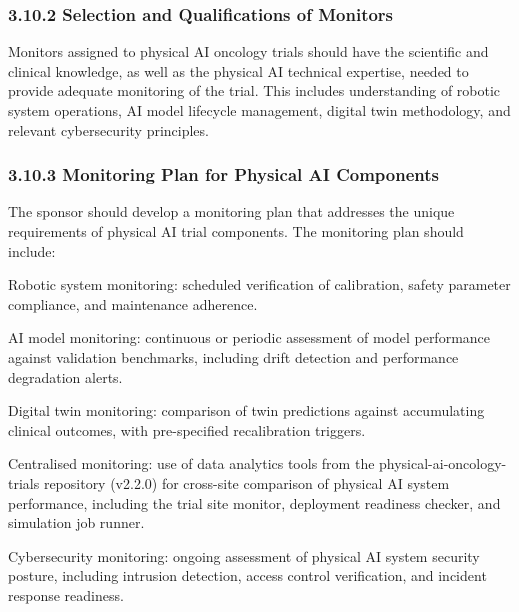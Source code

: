 \subsubsection{3.10.2 Selection and Qualifications of Monitors}

Monitors assigned to physical AI oncology trials should have the scientific and clinical knowledge, as well as the physical AI technical expertise, needed to provide adequate monitoring of the trial. This includes understanding of robotic system operations, AI model lifecycle management, digital twin methodology, and relevant cybersecurity principles.

\subsubsection{3.10.3 Monitoring Plan for Physical AI Components}

The sponsor should develop a monitoring plan that addresses the unique requirements of physical AI trial components. The monitoring plan should include:

\begin{description}[leftmargin=2.5cm,style=sameline]

\item[(a)] Robotic system monitoring: scheduled verification of calibration, safety parameter compliance, and maintenance adherence.

\item[(b)] AI model monitoring: continuous or periodic assessment of model performance against validation benchmarks, including drift detection and performance degradation alerts.

\item[(c)] Digital twin monitoring: comparison of twin predictions against accumulating clinical outcomes, with pre-specified recalibration triggers.

\item[(d)] Centralised monitoring: use of data analytics tools from the physical-ai-oncology-trials repository (v2.2.0) for cross-site comparison of physical AI system performance, including the trial site monitor, deployment readiness checker, and simulation job runner.

\item[(e)] Cybersecurity monitoring: ongoing assessment of physical AI system security posture, including intrusion detection, access control verification, and incident response readiness.

\end{description}

